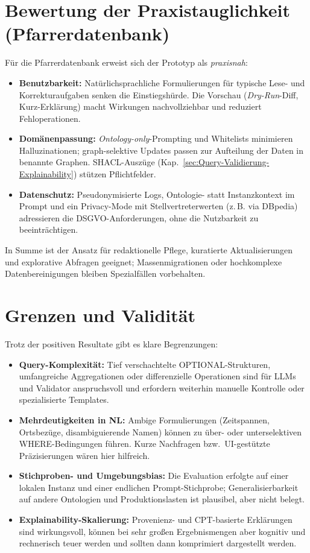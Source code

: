 \section*{Bewertung der Praxistauglichkeit (Pfarrerdatenbank)}
Für die Pfarrerdatenbank erweist sich der Prototyp als \emph{praxisnah}:
\begin{itemize}
  \item \textbf{Benutzbarkeit:} Natürlichsprachliche Formulierungen für typische Lese- und Korrekturaufgaben senken die Einstiegshürde. Die Vorschau (\emph{Dry-Run}-Diff, Kurz-Erklärung) macht Wirkungen nachvollziehbar und reduziert Fehloperationen.
  \item \textbf{Domänenpassung:} \emph{Ontology-only}-Prompting und Whitelists minimieren Halluzinationen; graph-selektive Updates passen zur Aufteilung der Daten in benannte Graphen. SHACL-Auszüge (Kap.~\ref{sec:Query-Validierung-Explainability}) stützen Pflichtfelder.
  \item \textbf{Datenschutz:} Pseudonymisierte Logs, Ontologie- statt Instanzkontext im Prompt und ein Privacy-Mode mit Stellvertreterwerten (z.\,B. via DBpedia) adressieren die DSGVO-Anforderungen, ohne die Nutzbarkeit zu beeinträchtigen.
\end{itemize}
In Summe ist der Ansatz für redaktionelle Pflege, kuratierte Aktualisierungen und explorative Abfragen geeignet; Massenmigrationen oder hochkomplexe Datenbereinigungen bleiben Spezialfällen vorbehalten.

\section*{Grenzen und Validität}
Trotz der positiven Resultate gibt es klare Begrenzungen:
\begin{itemize}
  \item \textbf{Query-Komplexität:} Tief verschachtelte OPTIONAL-Strukturen, umfangreiche Aggregationen oder differenzielle Operationen sind für LLMs und Validator anspruchsvoll und erfordern weiterhin manuelle Kontrolle oder spezialisierte Templates.
  \item \textbf{Mehrdeutigkeiten in NL:} Ambige Formulierungen (Zeitspannen, Ortsbezüge, disambiguierende Namen) können zu über- oder unterselektiven WHERE-Bedingungen führen. Kurze Nachfragen bzw.\ UI-gestützte Präzisierungen wären hier hilfreich.
  \item \textbf{Stichproben- und Umgebungsbias:} Die Evaluation erfolgte auf einer lokalen Instanz und einer endlichen Prompt-Stichprobe; Generalisierbarkeit auf andere Ontologien und Produktionslasten ist plausibel, aber nicht belegt.
  \item \textbf{Explainability-Skalierung:} Provenienz- und CPT-basierte Erklärungen sind wirkungsvoll, können bei sehr großen Ergebnismengen aber kognitiv und rechnerisch teuer werden und sollten dann komprimiert dargestellt werden.
\end{itemize}

